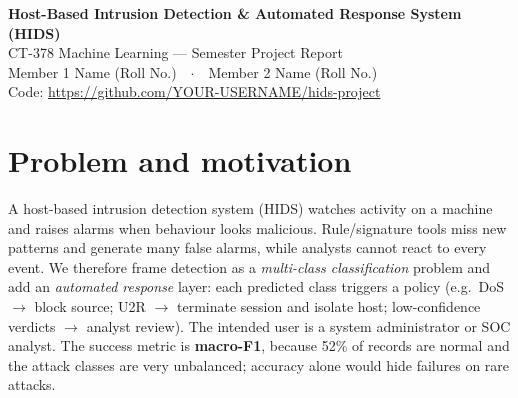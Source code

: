 \documentclass[10pt,a4paper]{article}
\newcommand{\memberA}{Member 1 Name (Roll No.)}
\newcommand{\memberB}{Member 2 Name (Roll No.)}
\newcommand{\githuburl}{https://github.com/YOUR-USERNAME/hids-project}
\begin{document}
\begin{center}
{\LARGE\bfseries Host-Based Intrusion Detection \& Automated Response System (HIDS)}\\[3pt]
CT-378 Machine Learning --- Semester Project Report\\[2pt]
\memberA\ \ $\cdot$\ \ \memberB\\[2pt]
{\small Code: \url{\githuburl}}
\end{center}

\begin{abstract}\noindent
We built a machine-learning intrusion detector that labels each host/connection record as \emph{Normal}, \emph{DoS},
\emph{Probe}, \emph{R2L} (remote-to-local, e.g.\ password guessing) or \emph{U2R} (user-to-root privilege escalation) and maps
the verdict to an automated response plan. Using 147{,}888 de-duplicated NSL-KDD records (41 features) we compared a majority-class
baseline with Logistic Regression, Random Forest and Histogram Gradient Boosting inside a leak-free scikit-learn pipeline with
5-fold GridSearchCV. The tuned Random Forest reached \textbf{99.5\% accuracy and 0.921 macro-F1} (ROC-AUC 0.999) on a held-out test set.
The rare U2R class is the weak point (F1 0.67). The model is deployed through Streamlit, a Hugging Face Space and a local Flask web app.
\end{abstract}

\section{Problem and motivation}
A host-based intrusion detection system (HIDS) watches activity on a machine and raises alarms when behaviour looks malicious.
Rule/signature tools miss new patterns and generate many false alarms, while analysts cannot react to every event. We therefore
frame detection as a \emph{multi-class classification} problem and add an \emph{automated response} layer: each predicted
class triggers a policy (e.g.\ DoS $\rightarrow$ block source; U2R $\rightarrow$ terminate session and isolate host; low-confidence
verdicts $\rightarrow$ analyst review). The intended user is a system administrator or SOC analyst. The success metric is
\textbf{macro-F1}, because 52\% of records are normal and the attack classes are very unbalanced; accuracy alone would hide
failures on rare attacks.
\end{document}
